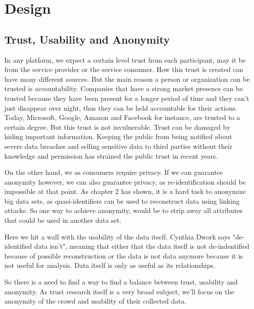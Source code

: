 
\chapter{Design}\label{chapter:design}
\section{Trust, Usability and Anonymity}
In any platform, we expect a certain level trust from each participant, may it be from the service provider or the service consumer. How this trust is created can have many different sources. But the main reason a person or organization can be trusted is accountability. Companies that have a strong market presence can be trusted because they have been present for a longer period of time and they can't just disappear over night, thus they can be held accountable for their actions. Today, Microsoft, Google, Amazon and Facebook for instance, are trusted to a certain degree. But this trust is not invulnerable. Trust can be damaged by hiding important information. Keeping the public from being notified about severe data breaches and selling sensitive data to third parties without their knowledge and permission has strained the public trust in recent years.

On the other hand, we as consumers require privacy. If we can guarantee anonymity however, we can also guarantee privacy, as re-identification should be impossible at that point.
As chapter 2 has shown, it is a hard task to anonymize big data sets, as quasi-identifiers can be used to reconstruct data using linking attacks. So one way to achieve anonymity, would be to strip away all attributes that could be used in another data set.

Here we hit a wall with the usability of the data itself. Cynthia Dwork says "de-identified data isn't",
meaning that either that the data itself is not de-indentified because of possible reconstruction or the data is not data anymore because it is not useful for analysis. Data itself is only as useful as its relationships.

So there is a need to find a way to find a balance between trust, usability and anonymity. As trust research itself is a very broad subject, we'll focus on the anonymity of the crowd and usability of their collected data.

